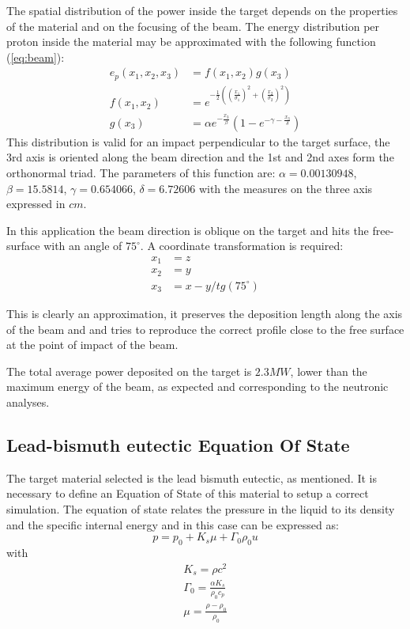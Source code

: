 \documentclass[a4paper, 11pt, twocolumn]{article}
\begin{document}
The spatial distribution of the power inside the target depends on the properties of the material and on the focusing of the beam. The energy distribution per proton inside the material may be approximated with the following function (\ref{eq:beam}):
\begin{equation}
\begin{split}
e_p(x_1, x_2, x_3) & = f(x_1, x_2) g(x_3) \\
f(x_1, x_2) & = e^{-\frac{1}{2} \left( \left( \frac{x_1}{\sigma_1}\right)^2 + \left( \frac{x_2}{\sigma_2}\right)^2 \right) } \\
g(x_3) & = \alpha e^{ -\frac{x_3}{\beta}} \left( 1 - e^{-\gamma -\frac{x_3}{\delta}}\right)
\end{split}
\label{eq:beam}
\end{equation}
This distribution is valid for an impact perpendicular to the target surface, the 3rd axis is oriented along the beam direction and the 1st and 2nd axes form the orthonormal triad. The parameters of this function are: $\alpha = 0.00130948$, $\beta = 15.5814$, $\gamma = 0.654066$, $\delta = 6.72606$ with the measures on the three axis expressed in $cm$.

In this application the beam direction is oblique on the target and hits the free-surface with an angle of $75^\circ$. A coordinate transformation is required:
\begin{equation}
\begin{split}
x_1 & = z \\
x_2 & = y \\
x_3 & = x - y / tg(75^\circ)
\end{split}
\end{equation}

This is clearly an approximation,  it preserves the deposition length along the axis of the beam and and tries to reproduce the correct profile close to the free surface at the point of impact of the beam.

The total average power deposited on the target is $2.3MW$, lower than the maximum energy of the beam, as expected and corresponding to the neutronic analyses.

\subsection{Lead-bismuth eutectic Equation Of State}
The target material selected is the lead bismuth eutectic, as mentioned. It is necessary to define an Equation of State of this material to setup a correct simulation. The equation of state relates the pressure in the liquid to its density and the specific internal energy and in this case can be expressed as:
\begin{equation}
p = p_0 + K_s \mu + \Gamma_0 \rho_0 u
\end{equation}
with
\begin{eqnarray*}
K_s = \rho c^2 \\
\Gamma_0 = \frac{\alpha K_s}{\rho_0 c_p}\\
\mu = \frac{\rho - \rho_0}{\rho_0}
\end{eqnarray*}
\end{document}
